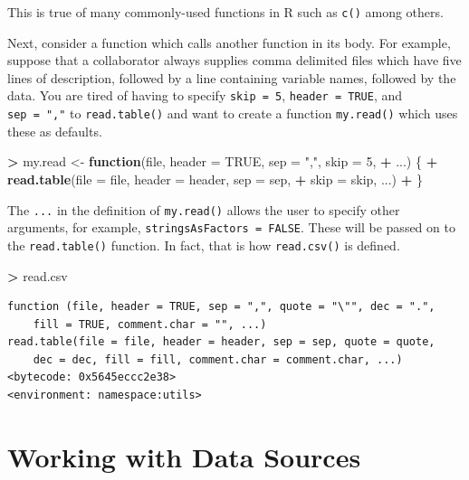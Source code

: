 \documentclass[]{krantz}
\makeatletter
\newenvironment{Shaded}{\begin{snugshade}}{\end{snugshade}}
\newcommand{\ControlFlowTok}[1]{\textcolor[rgb]{0.27,0.27,0.27}{\textbf{#1}}}
\newcommand{\DataTypeTok}[1]{\textcolor[rgb]{0.27,0.27,0.27}{#1}}
\newcommand{\DecValTok}[1]{\textcolor[rgb]{0.06,0.06,0.06}{#1}}
\newcommand{\KeywordTok}[1]{\textcolor[rgb]{0.27,0.27,0.27}{\textbf{#1}}}
\newcommand{\NormalTok}[1]{#1}
\newcommand{\OperatorTok}[1]{\textcolor[rgb]{0.43,0.43,0.43}{\textbf{#1}}}
\newcommand{\OtherTok}[1]{\textcolor[rgb]{0.37,0.37,0.37}{#1}}
\newcommand{\StringTok}[1]{\textcolor[rgb]{0.5,0.5,0.5}{#1}}
\newenvironment{kframe}{%
\medskip{}
\setlength{\fboxsep}{.8em}
 \def\at@end@of@kframe{}%
 \ifinner\ifhmode%
  \def\at@end@of@kframe{\end{minipage}}%
  \begin{minipage}{\columnwidth}%
 \fi\fi%
 \def\FrameCommand##1{\hskip\@totalleftmargin \hskip-\fboxsep
 \colorbox{shadecolor}{##1}\hskip-\fboxsep
     \hskip-\linewidth \hskip-\@totalleftmargin \hskip\columnwidth}%
 \MakeFramed {\advance\hsize-\width
   \@totalleftmargin\z@ \linewidth\hsize
   \@setminipage}}%
 {\par\unskip\endMakeFramed%
 \at@end@of@kframe}
\renewenvironment{Shaded}{\begin{kframe}}{\end{kframe}}
\makeatother
\begin{document}
This is true of many commonly-used functions in R such as \texttt{c()} among others.

Next, consider a function which calls another function in its body. For example, suppose that a collaborator always supplies comma delimited files which have five lines of description, followed by a line containing variable names, followed by the data. You are tired of having to specify \texttt{skip\ =\ 5}, \texttt{header\ =\ TRUE}, and \texttt{sep\ =\ ","} to \texttt{read.table()} and want to create a function \texttt{my.read()} which uses these as defaults.

\begin{Shaded}
\begin{Highlighting}[]
\OperatorTok{>}\StringTok{ }\NormalTok{my.read <-}\StringTok{ }\ControlFlowTok{function}\NormalTok{(file, }\DataTypeTok{header =} \OtherTok{TRUE}\NormalTok{, }\DataTypeTok{sep =} \StringTok{","}\NormalTok{, }\DataTypeTok{skip =} \DecValTok{5}\NormalTok{, }
\OperatorTok{+}\StringTok{   }\NormalTok{...) \{}
\OperatorTok{+}\StringTok{   }\KeywordTok{read.table}\NormalTok{(}\DataTypeTok{file =}\NormalTok{ file, }\DataTypeTok{header =}\NormalTok{ header, }\DataTypeTok{sep =}\NormalTok{ sep, }
\OperatorTok{+}\StringTok{     }\DataTypeTok{skip =}\NormalTok{ skip, ...)}
\OperatorTok{+}\StringTok{ }\NormalTok{\}}
\end{Highlighting}
\end{Shaded}

The \texttt{...} in the definition of \texttt{my.read()} allows the user to specify other arguments, for example, \texttt{stringsAsFactors\ =\ FALSE}. These will be passed on to the \texttt{read.table()} function. In fact, that is how \texttt{read.csv()} is defined.

\begin{Shaded}
\begin{Highlighting}[]
\OperatorTok{>}\StringTok{ }\NormalTok{read.csv}
\end{Highlighting}
\end{Shaded}

\begin{verbatim}
function (file, header = TRUE, sep = ",", quote = "\"", dec = ".", 
    fill = TRUE, comment.char = "", ...) 
read.table(file = file, header = header, sep = sep, quote = quote, 
    dec = dec, fill = fill, comment.char = comment.char, ...)
<bytecode: 0x5645eccc2e38>
<environment: namespace:utils>
\end{verbatim}

\hypertarget{working-with-data-sources}{%
\chapter{Working with Data Sources}\label{working-with-data-sources}}
\end{document}
